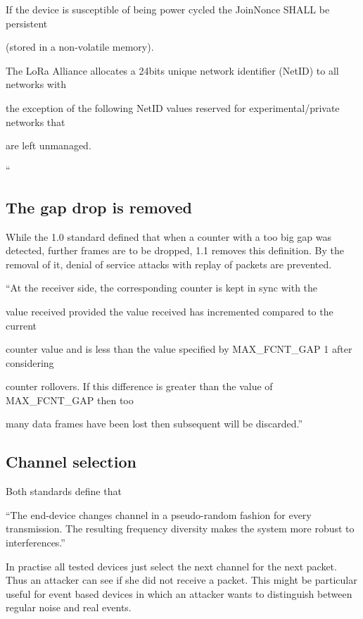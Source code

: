 {{If the device is susceptible of being power cycled the JoinNonce SHALL
be persistent}

{(stored in a non-volatile memory).}

{The LoRa Alliance allocates a 24bits unique network identifier (NetID)
to all networks with}

{the exception of the following NetID values reserved for
experimental/private networks that}

{are left unmanaged.}

{``}

\hypertarget{h.6wjpqn9cabfu}{\subsection{\texorpdfstring{{The gap drop
is removed}}{The gap drop is removed}}\label{h.6wjpqn9cabfu}}

{While the 1.0 standard defined that when a counter with a too big gap
was detected, further frames are to be dropped, 1.1 removes this
definition. By the removal of it, denial of service attacks with replay
of packets are prevented.}

{``At the receiver side, the corresponding counter is kept in sync with
the}

{value received provided the value received has incremented compared to
the current}

{counter value and is less than the value specified by MAX\_FCNT\_GAP 1
after considering}

{counter rollovers. If this difference is greater than the value of
MAX\_FCNT\_GAP then too}

{many data frames have been lost then subsequent will be discarded.''}

\hypertarget{h.7ctbv6nd7du7}{\subsection{\texorpdfstring{{Channel
selection}}{Channel selection}}\label{h.7ctbv6nd7du7}}

{Both standards define that }

{``The end-device changes channel in a pseudo-random fashion for every
transmission. The resulting frequency diversity makes the system more
robust to interferences.''}

{In practise all tested devices just select the next channel for the
next packet. Thus an attacker can see if she did not receive a packet.
This might be particular useful for event based devices in which an
attacker wants to distinguish between regular noise and real events.}

}
